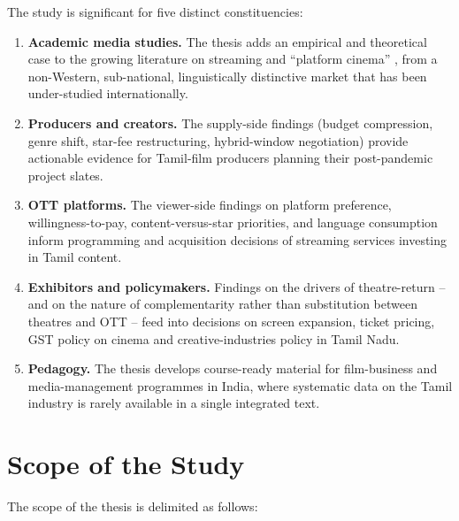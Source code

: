 The study is significant for five distinct constituencies:

\begin{enumerate}[itemsep=2pt]
\item \textbf{Academic media studies.}  The thesis adds an empirical
      and theoretical case to the growing literature on streaming
      and ``platform cinema'' \citep{lobato2019,tryon2009,curtin2014},
      from a non-Western, sub-national, linguistically distinctive
      market that has been under-studied internationally.
\item \textbf{Producers and creators.}  The supply-side findings
      (budget compression, genre shift, star-fee restructuring,
      hybrid-window negotiation) provide actionable evidence for
      Tamil-film producers planning their post-pandemic project
      slates.
\item \textbf{OTT platforms.}  The viewer-side findings on platform
      preference, willingness-to-pay, content-versus-star priorities,
      and language consumption inform programming and acquisition
      decisions of streaming services investing in Tamil content.
\item \textbf{Exhibitors and policymakers.}  Findings on the drivers
      of theatre-return -- and on the nature of complementarity
      rather than substitution between theatres and OTT -- feed into
      decisions on screen expansion, ticket pricing, GST policy on
      cinema and creative-industries policy in Tamil Nadu.
\item \textbf{Pedagogy.}  The thesis develops course-ready material
      for film-business and media-management programmes in India,
      where systematic data on the Tamil industry is rarely
      available in a single integrated text.
\end{enumerate}

\section{Scope of the Study}
\label{sec:scope}

The scope of the thesis is delimited as follows:

